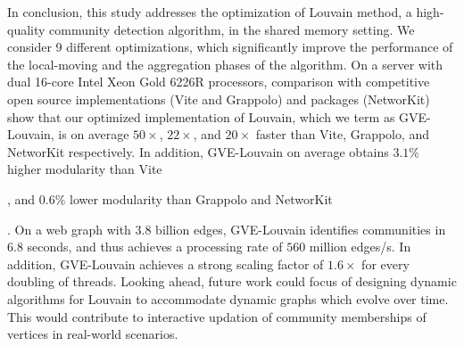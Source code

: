 In conclusion, this study addresses the optimization of Louvain method, a high-quality community detection algorithm, in the shared memory setting. We consider 9 different optimizations, which significantly improve the performance of the local-moving and the aggregation phases of the algorithm. On a server with dual 16-core Intel Xeon Gold 6226R processors, comparison with competitive open source implementations (Vite and Grappolo) and packages (NetworKit) show that our optimized implementation of Louvain, which we term as GVE-Louvain, is on average $50\times$, $22\times$, and $20\times$ faster than Vite, Grappolo, and NetworKit respectively. In addition, GVE-Louvain on average obtains $3.1\%$ higher modularity than Vite, and $0.6\%$ lower modularity than Grappolo and NetworKit. On a web graph with $3.8$ billion edges, GVE-Louvain identifies communities in $6.8$ seconds, and thus achieves a processing rate of $560$ million edges/s. In addition, GVE-Louvain achieves a strong scaling factor of $1.6\times$ for every doubling of threads. Looking ahead, future work could focus of designing dynamic algorithms for Louvain to accommodate dynamic graphs which evolve over time. This would contribute to interactive updation of community memberships of vertices in real-world scenarios.
